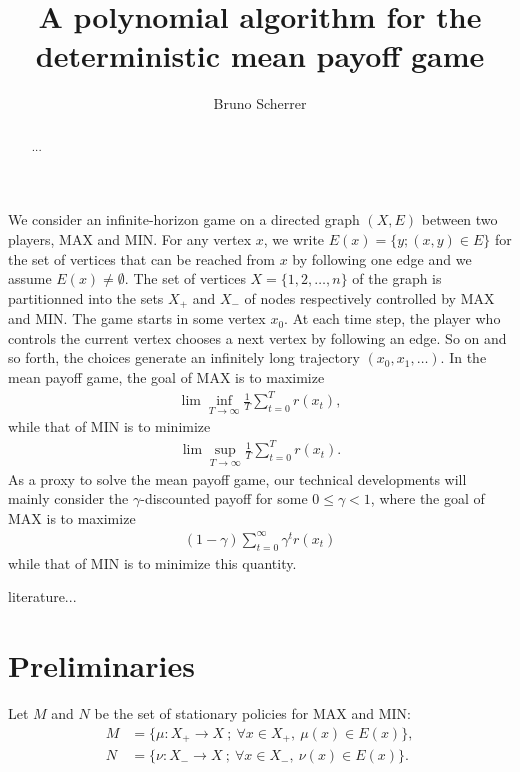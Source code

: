 \documentclass{article}
\title{A polynomial algorithm for the deterministic mean payoff game}
\author{Bruno Scherrer}
\begin{document}
\maketitle

\begin{abstract}
...
\end{abstract}
  
We consider an infinite-horizon game on a directed graph $(X,E)$ between two players, MAX and MIN. For any vertex $x$, we write $E(x)=\{y;(x,y) \in E\}$ for the set of vertices that can be reached from $x$ by following one edge and we assume $E(x)\neq\emptyset$.  The set of vertices $X=\{1,2,\dots,n\}$ of the graph is partitionned into the sets $X_+$ and $X_-$ of nodes respectively controlled by MAX and MIN. The game starts in some vertex $x_0$. At each time step, the player who controls the current vertex chooses a next vertex by following an edge. So on and so forth, the choices generate an infinitely long trajectory $(x_0,x_1,\dots)$. In the mean payoff game, the goal of MAX is to maximize
\begin{align}
\lim\inf_{T \to \infty} \frac 1 T \sum_{t=0}^{T} r(x_t),
\end{align}
while that of MIN is to minimize
\begin{align}
\lim\sup_{T \to \infty} \frac 1 T \sum_{t=0}^{T} r(x_t).
\end{align}
As a proxy to solve the mean payoff game, our technical developments will mainly consider the $\gamma$-discounted payoff for some $0\le\gamma<1$, where the goal of MAX is to maximize
\begin{align}
(1-\gamma)\sum_{t=0}^{\infty} \gamma^t r(x_t)
\end{align}
while that of MIN is to minimize this quantity.

literature...

\section{Preliminaries}

Let $M$ and $N$ be the set of stationary policies for MAX and MIN:
\begin{align}
  M &= \{ \mu:X_+ \to X ~;~ \forall x\in X_+,~ \mu(x) \in E(x) \}, \\
  N & =\{ \nu:X_- \to X ~;~ \forall x\in X_-,~ \nu(x) \in E(x) \}.
\end{align}
\end{document}
